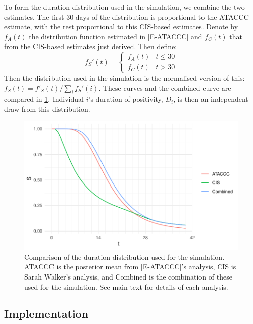 \documentclass[thesis.tex]{subfiles}
\begin{document}
To form the duration distribution used in the simulation, we combine the two estimates.
The first 30 days of the distribution is proportional to the ATACCC estimate, with the rest proportional to this CIS-based estimates.
Denote by $f_A(t)$ the distribution function estimated in \cref{E-ATACCC} and $f_C(t)$ that from the CIS-based estimates just derived.
Then define:
$$
f_S'(t) = \begin{cases}
	f_A(t) &t \leq 30 \\
	f_C(t) &t > 30
\end{cases}
$$
Then the distribution used in the simulation is the normalised version of this: $f_S(t) = f'_S(t)/\sum_i f_S'(i)$.
These curves and the combined curve are compared in \cref{perf-test:fig:duration-dist}.
Individual $i$'s duration of positivity, $D_i$, is then an independent draw from this distribution.
\begin{figure}
  \centering \includegraphics{cis-perfect-testing/input-duration-dists}
  \caption[Comparison of duration distributions]{Comparison of the duration distribution used for the simulation. ATACCC is the posterior mean from \cref{E-ATACCC}'s analysis, CIS is Sarah Walker's analysis, and Combined is the combination of these used for the simulation. See main text for details of each analysis. \label{perf-test:fig:duration-dist}}
\end{figure}

\subsection{Implementation}
\end{document}
